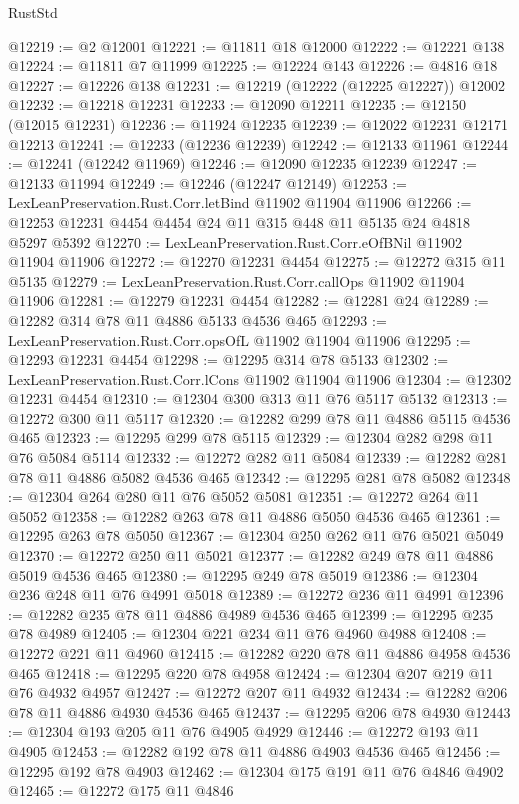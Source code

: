 \begin{lexlean}{RustStd}
\begin{coremodule}
@12219 := @2 @12001
@12221 := @11811 @18 @12000
@12222 := @12221 @138
@12224 := @11811 @7 @11999
@12225 := @12224 @143
@12226 := @4816 @18
@12227 := @12226 @138
@12231 := @12219 (@12222 (@12225 @12227)) @12002
@12232 := @12218 @12231
@12233 := @12090 @12211
@12235 := @12150 (@12015 @12231)
@12236 := @11924 @12235
@12239 := @12022 @12231 @12171 @12213
@12241 := @12233 (@12236 @12239)
@12242 := @12133 @11961
@12244 := @12241 (@12242 @11969)
@12246 := @12090 @12235 @12239
@12247 := @12133 @11994
@12249 := @12246 (@12247 @12149)
@12253 := LexLeanPreservation.Rust.Corr.letBind @11902 @11904 @11906
@12266 := @12253 @12231 @4454 @4454 @24 @11 @315 @448 @11 @5135 @24 @4818 @5297 @5392
@12270 := LexLeanPreservation.Rust.Corr.eOfBNil @11902 @11904 @11906
@12272 := @12270 @12231 @4454
@12275 := @12272 @315 @11 @5135
@12279 := LexLeanPreservation.Rust.Corr.callOps @11902 @11904 @11906
@12281 := @12279 @12231 @4454
@12282 := @12281 @24
@12289 := @12282 @314 @78 @11 @4886 @5133 @4536 @465
@12293 := LexLeanPreservation.Rust.Corr.opsOfL @11902 @11904 @11906
@12295 := @12293 @12231 @4454
@12298 := @12295 @314 @78 @5133
@12302 := LexLeanPreservation.Rust.Corr.lCons @11902 @11904 @11906
@12304 := @12302 @12231 @4454
@12310 := @12304 @300 @313 @11 @76 @5117 @5132
@12313 := @12272 @300 @11 @5117
@12320 := @12282 @299 @78 @11 @4886 @5115 @4536 @465
@12323 := @12295 @299 @78 @5115
@12329 := @12304 @282 @298 @11 @76 @5084 @5114
@12332 := @12272 @282 @11 @5084
@12339 := @12282 @281 @78 @11 @4886 @5082 @4536 @465
@12342 := @12295 @281 @78 @5082
@12348 := @12304 @264 @280 @11 @76 @5052 @5081
@12351 := @12272 @264 @11 @5052
@12358 := @12282 @263 @78 @11 @4886 @5050 @4536 @465
@12361 := @12295 @263 @78 @5050
@12367 := @12304 @250 @262 @11 @76 @5021 @5049
@12370 := @12272 @250 @11 @5021
@12377 := @12282 @249 @78 @11 @4886 @5019 @4536 @465
@12380 := @12295 @249 @78 @5019
@12386 := @12304 @236 @248 @11 @76 @4991 @5018
@12389 := @12272 @236 @11 @4991
@12396 := @12282 @235 @78 @11 @4886 @4989 @4536 @465
@12399 := @12295 @235 @78 @4989
@12405 := @12304 @221 @234 @11 @76 @4960 @4988
@12408 := @12272 @221 @11 @4960
@12415 := @12282 @220 @78 @11 @4886 @4958 @4536 @465
@12418 := @12295 @220 @78 @4958
@12424 := @12304 @207 @219 @11 @76 @4932 @4957
@12427 := @12272 @207 @11 @4932
@12434 := @12282 @206 @78 @11 @4886 @4930 @4536 @465
@12437 := @12295 @206 @78 @4930
@12443 := @12304 @193 @205 @11 @76 @4905 @4929
@12446 := @12272 @193 @11 @4905
@12453 := @12282 @192 @78 @11 @4886 @4903 @4536 @465
@12456 := @12295 @192 @78 @4903
@12462 := @12304 @175 @191 @11 @76 @4846 @4902
@12465 := @12272 @175 @11 @4846

\end{coremodule}
\end{lexlean}
